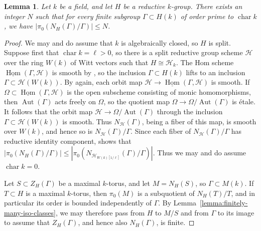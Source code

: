 \documentclass[reqno]{amsart}
\numberwithin{equation}{subsection}
\newcommand\cH{\mathcal{H}}
\DeclareMathOperator{\Hom}{Hom}
\DeclareMathOperator{\Aut}{Aut}
\newtheorem{lemma}[thm]{Lemma}
\theoremstyle{remark}
\numberwithin{equation}{subsection}
\numberwithin{figure}{subsection}
\begin{document}
\begin{lemma}\label{lemma:finite-subgroup-normalizer-bound}
Let $k$ be a field, and let $H$ be a reductive $k$-group. There exists an integer $N$ such that for every finite subgroup $\Gamma \subset H(k)$ of order prime to $\operatorname{char} k$, we have $|\pi_0(N_H(\Gamma)/\Gamma)| \leq N$.
\end{lemma}

\begin{proof}
We may and do assume that $k$ is algebraically closed, so $H$ is split. Suppose first that $\operatorname{char} k = \ell > 0$, so there is a split reductive group scheme $\cH$ over the ring $W(k)$ of Witt vectors such that $H \cong \cH_k$. The Hom scheme $\underline{\Hom}(\Gamma, \cH)$ is smooth by \cite[Lemma A.1]{DHKM25}, so the inclusion $\Gamma \subset H(k)$ lifts to an inclusion $\Gamma \subset \cH(W(k))$. By \cite[Lemma A.1]{DHKM25} again, each orbit map $\cH \to \underline{\Hom}(\Gamma, \cH)$ is smooth. If $\Omega \subset \underline{\Hom}(\Gamma, \cH)$ is the open subscheme consisting of monic homomorphisms, then $\Aut(\Gamma)$ acts freely on $\Omega$, so the quotient map $\Omega \to \Omega/\Aut(\Gamma)$ is \'etale. It follows that the orbit map $\cH \to \Omega/\Aut(\Gamma)$ through the inclusion $\Gamma \subset \cH(W(k))$ is smooth. Thus $N_{\cH}(\Gamma)$, being a fiber of this map, is smooth over $W(k)$, and hence so is $N_{\cH}(\Gamma)/\Gamma$. Since each fiber of $N_{\cH}(\Gamma)/\Gamma$ has reductive identity component, \cite[Proposition 3.1.3]{Con14} shows that $|\pi_0(N_H(\Gamma)/\Gamma)| \leq |\pi_0(N_{\cH_{W(k)[1/\ell]}}(\Gamma)/\Gamma)|$. Thus we may and do assume $\operatorname{char} k = 0$.

Let $S \subset Z_H(\Gamma)$ be a maximal $k$-torus, and let $M = N_H(S)$, so $\Gamma \subset M(k)$. If $T \subset H$ is a maximal $k$-torus, then $\pi_0(M)$ is a subquotient of $N_H(T)/T$, and in particular its order is bounded independently of $\Gamma$. By Lemma~\ref{lemma:finitely-many-iso-classes}, we may therefore pass from $H$ to $M/S$ and from $\Gamma$ to its image to assume that $Z_H(\Gamma)$, and hence also $N_H(\Gamma)$, is finite.


\end{proof}
\end{document}
